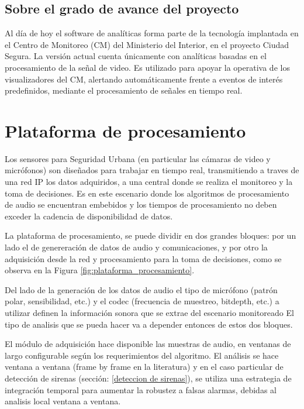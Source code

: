 \documentclass{article}
\begin{document}
\subsection{Sobre el grado de avance del proyecto}                            
Al día de hoy el software de analíticas forma parte de la tecnología implantada en el Centro de Monitoreo (CM) del Ministerio del Interior, en el proyecto Ciudad Segura. La versión actual cuenta únicamente con analíticas basadas en el procesamiento de la señal de video. Es utilizado para apoyar la operativa de los visualizadores del CM, alertando automáticamente frente a eventos de interés predefinidos, mediante el procesamiento de señales en tiempo real.  



\section{Plataforma de procesamiento}
\label{PP}
Los sensores para Seguridad Urbana (en particular las cámaras de video y micrófonos) son diseñados para trabajar en tiempo real, transmitiendo a traves de una red IP los datos adquiridos, a una central donde se realiza el monitoreo y la toma de decisiones. Es en este escenario donde los algoritmos de procesamiento de audio se encuentran embebidos y los tiempos de procesamiento no deben exceder la cadencia de disponibilidad de datos.
\smallskip

La plataforma de procesamiento, se puede dividir en dos grandes bloques: por un lado el de genereración de datos de audio y comunicaciones, y por otro la adquisición desde la red y procesamiento para la toma de decisiones, como se observa en la Figura \ref{fig:plataforma_procesamiento}.
\smallskip

Del lado de la generación de los datos de audio el tipo de micrófono (patrón polar, sensibilidad, etc.) y el codec (frecuencia de muestreo, bitdepth, etc.) a utilizar definen la información sonora que se extrae del escenario monitoreado El tipo de analisis que se pueda hacer va a depender entonces de estos dos bloques.
\smallskip

El módulo de adquisición hace disponible las muestras de audio, en ventanas de largo configurable según los requerimientos del algoritmo. El análisis se hace ventana a ventana (frame by frame en la literatura) y en el caso particular de detección de sirenas (sección: \ref{deteccion de sirenas}), se utiliza una estrategia de integración temporal para aumentar la robustez a falsas alarmas, debidas al analisis local ventana a ventana.
\end{document}
